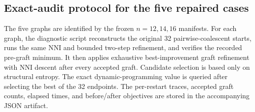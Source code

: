 \subsection{Exact-audit protocol for the five repaired cases}

The five graphs are identified by the frozen $n=12,14,16$ manifests. For each
graph, the diagnostic script reconstructs the original 32 pairwise-coalescent
starts, runs the same NNI and bounded two-step refinement, and verifies the
recorded pre-graft minimum. It then applies exhaustive best-improvement graft
refinement with NNI descent after every accepted graft. Candidate selection is
based only on structural entropy. The exact dynamic-programming value is
queried after selecting the best of the 32 endpoints. The per-restart traces,
accepted graft counts, elapsed times, and before/after objectives are stored in
the accompanying JSON artifact.
